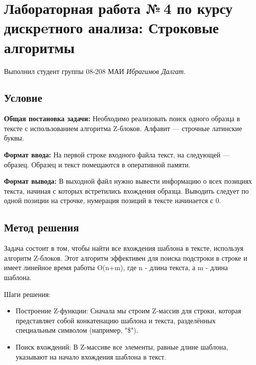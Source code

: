\documentclass[12pt]{article}
\begin{document}
\section*{Лабораторная работа №\,4 по курсу дискрeтного анализа: Строковые алгоритмы}

\noindent Выполнил студент группы 08-208 МАИ \textit{Ибрагимов Далгат}.

\subsection*{Условие}
\textbf{Общая постановка задачи:} Необходимо реализовать поиск одного образца в тексте с использованием алгоритма Z-блоков. Алфавит — строчные латинские буквы.

\textbf{Формат ввода:}
На первой строке входного файла текст, на следующей — образец. Образец и текст помещаются в оперативной памяти.

\textbf{Формат вывода:}
В выходной файл нужно вывести информацию о всех позициях текста, начиная с которых встретились вхождения образца. Выводить следует по одной позиции на строчке, нумерация позиций в тексте начинается с 0.

\subsection*{Метод решения}
Задача состоит в том, чтобы найти все вхождения шаблона в тексте, используя алгоритм Z-блоков. Этот алгоритм эффективен для поиска подстроки в строке и имеет линейное время работы
O(n+m), где n - длина текста, а m - длина шаблона.

Шаги решения:\begin{itemize}
	\item Построение Z-функции: Сначала мы строим Z-массив для строки, которая представляет собой конкатенацию шаблона и текста, разделённых специальным символом (например, "\$").

	\item Поиск вхождений: В Z-массиве все элементы, равные длине шаблона, указывают на начало вхождения шаблона в текст.
\end{itemize}
\end{document}
